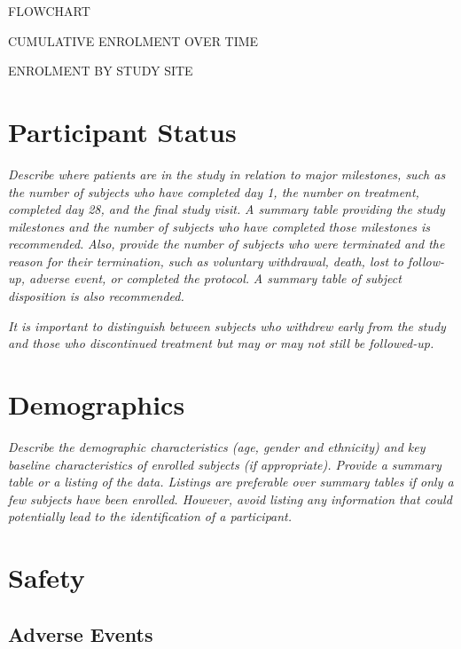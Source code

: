 \documentclass[
  11pt,
]{article}
\begin{document}
FLOWCHART

CUMULATIVE ENROLMENT OVER TIME

ENROLMENT BY STUDY SITE

\clearpage

\hypertarget{participant-status}{%
\section{Participant Status}\label{participant-status}}

\emph{Describe where patients are in the study in relation to major milestones, such as the number of subjects who have completed day 1, the number on treatment, completed day 28, and the final study visit.} \emph{A summary table providing the study milestones and the number of subjects who have completed those milestones is recommended.} \emph{Also, provide the number of subjects who were terminated and the reason for their termination, such as voluntary withdrawal, death, lost to follow-up, adverse event, or completed the protocol.} \emph{A summary table of subject disposition is also recommended.}

\emph{It is important to distinguish between subjects who withdrew early from the study and those who discontinued treatment but may or may not still be followed-up.}

\clearpage

\hypertarget{demographics}{%
\section{Demographics}\label{demographics}}

\emph{Describe the demographic characteristics (age, gender and ethnicity) and key baseline characteristics of enrolled subjects (if appropriate). Provide a summary table or a listing of the data. Listings are preferable over summary tables if only a few subjects have been enrolled. However, avoid listing any information that could potentially lead to the identification of a participant.}

\clearpage

\hypertarget{safety}{%
\section{Safety}\label{safety}}

\hypertarget{adverse-events}{%
\subsection{Adverse Events}\label{adverse-events}}
\end{document}
